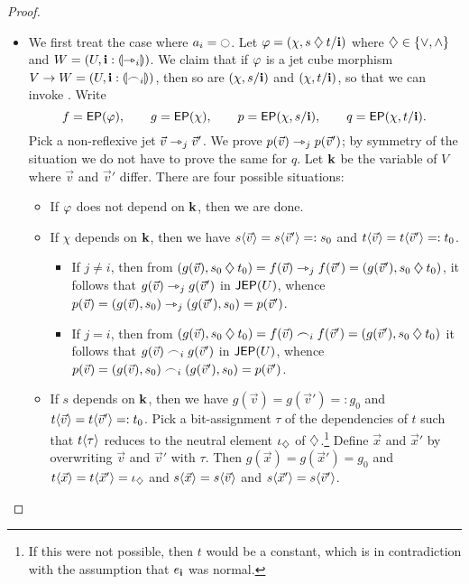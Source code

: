 \documentclass[a4paper]{memoir}
\begin{document}
\begin{proof}
\begin{itemize}
		\begin{itemize}
			\item We first treat the case where $a_i = \npolar$.
			Let $\varphi = (\chi, s \mathbin{\diamondsuit} t/\mathbf{i})$ where $\mathbin{\diamondsuit} \in \mathopen{}\left\{ {\vee}, {\wedge} \right\}\mathclose{}$ and $W = (U, \mathbf{i} : {\llparenthesis \rightarrowtriangle_i \rrparenthesis})$.
			We claim that if $\varphi$ is a jet cube morphism $V \to W = (U, \mathbf{i} : {\llparenthesis \frown_i \rrparenthesis})$, then so are $(\chi, s/\mathbf{i})$ and $(\chi, t/\mathbf{i})$, so that we can invoke .
			Write
			\[
				f = \mathsf{EP}(\varphi), \qquad
				g = \mathsf{EP}(\chi), \qquad
				p = \mathsf{EP}(\chi, s/\mathbf{i}), \qquad
				q = \mathsf{EP}(\chi, t/\mathbf{i}).
			\]
			Pick a non-reflexive jet $\vec v \rightarrowtriangle_j \vec v'$.
			We prove $p(\vec v) \rightarrowtriangle_j p(\vec v')$; by symmetry of the situation we do not have to prove the same for $q$.
			Let $\mathbf{k}$ be the variable of $V$ where $\vec v$ and $\vec v'$ differ.
			There are four possible situations:
			\begin{itemize}
				\item If $\varphi$ does not depend on $\mathbf{k}$, then we are done.
				\item If $\chi$ depends on $\mathbf{k}$, then we have $s \langle \vec v \rangle = s \langle \vec v' \rangle =: s_0$ and $t \langle \vec v \rangle = t \langle \vec v' \rangle =: t_0$.
				\begin{itemize}
					\item If $j \neq i$, then from $(g(\vec v), s_0 \mathbin{\diamondsuit} t_0) = f(\vec v) \rightarrowtriangle_j f(\vec v') = (g(\vec v'), s_0 \mathbin{\diamondsuit} t_0)$, it follows that $g(\vec v) \rightarrowtriangle_j g(\vec v')$ in $\mathsf{JEP}(U)$, whence $p(\vec v) = (g(\vec v), s_0) \rightarrowtriangle_j (g(\vec v'), s_0) = p(\vec v')$.
					\item If $j = i$, then from $(g(\vec v), s_0 \mathbin{\diamondsuit} t_0) = f(\vec v) \frown_i f(\vec v') = (g(\vec v'), s_0 \mathbin{\diamondsuit} t_0)$ it follows that $g(\vec v) \frown_i g(\vec v')$ in $\mathsf{JEP}(U)$, whence $p(\vec v) = (g(\vec v), s_0) \frown_i (g(\vec v'), s_0) = p(\vec v')$.
				\end{itemize}
				\item If $s$ depends on $\mathbf{k}$, then we have $g(\vec v) = g(\vec v') =: g_0$ and $t \langle \vec v \rangle = t \langle \vec v' \rangle =: t_0$.
				Pick a bit-assignment $\tau$ of the dependencies of $t$ such that $t \langle \tau \rangle$ reduces to the neutral element $\iota_{\mathbin{\diamondsuit}}$ of $\mathbin{\diamondsuit}$.\footnote{If this were not possible, then $t$ would be a constant, which is in contradiction with the assumption that $e_{\mathbf{i}}$ was normal.}
				Define $\vec x$ and $\vec x'$ by overwriting $\vec v$ and $\vec v'$ with $\tau$. Then $g(\vec x) = g(\vec x') = g_0$ and $t \langle \vec x \rangle = t \langle \vec x' \rangle = \iota_{\mathbin{\diamondsuit}}$ and $s \langle \vec x \rangle = s \langle \vec v \rangle$ and $s \langle \vec x' \rangle = s \langle \vec v' \rangle$.

\end{itemize}
\end{itemize}
\end{itemize}
\end{proof}
\end{document}
